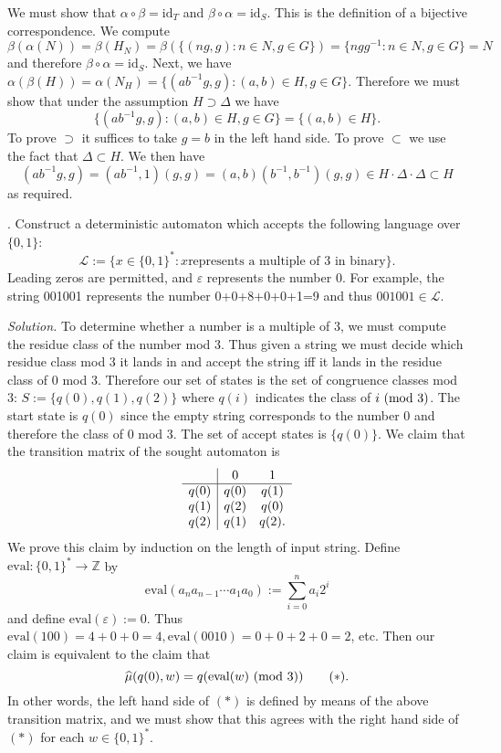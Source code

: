 \documentclass[10pt,a4paper,reqno]{amsart}
\begin{document}
We must show that $\alpha \circ \beta = \mathrm{id}_T$ and $\beta \circ \alpha
= \mathrm{id}_S$. This is the definition of a bijective correspondence. We
compute \[\beta(\alpha(N)) = \beta(H_N) = \beta( \{(ng,g) : n\in N, g\in G\}  )
= \{n g g^{-1} : n \in N, g \in G\} = N\] and therefore $\beta\circ \alpha =
\mathrm{id}_S$. Next, we have \( \alpha(\beta(H)) = \alpha(N_H) = \{
(ab^{-1}g,g) : (a,b) \in H, g\in G \}.\) Therefore we must show that under
the assumption $H \supset \Delta$ we have \[\{ (ab^{-1}g,g) : (a,b) \in H,
g\in G \} = \{(a,b) \in H\}.\] To prove $\supset$ it suffices to take $g=b$
in the left hand side. To prove $\subset$ we use the fact that $\Delta
\subset H$. We then have $$(ab^{-1}g,g) = (ab^{-1},1)(g,g) =
(a,b)(b^{-1},b^{-1})(g,g) \in H\cdot \Delta \cdot \Delta \subset H$$ as
required.

\bigskip

. Construct a deterministic automaton which accepts the following
language over \(\{0,1\}\): \[\mathscr{L} := \{x \in \{0,1\}^* : x \text{
represents a multiple of 3 in binary}\}.\] Leading zeros are permitted, and
$\varepsilon$ represents the number 0. For example, the string 001001
represents the number 0+0+8+0+0+1=9 and thus $001001 \in \mathscr{L}$.

\bigskip

\emph{Solution.} To determine whether a number is a multiple of 3, we must
compute the residue class of the number mod 3. Thus given a string we must
decide which residue class mod 3 it lands in and accept the string iff it lands
in the residue class of 0 mod 3. Therefore our set of states is the set of
congruence classes mod 3: $S := \{q(0), q(1), q(2)\}$ where $q(i)$ indicates
the class of $i \text{ } (\mathrm{mod}\text{ } 3)$. The start state is $q(0)$ since the empty string
corresponds to the number 0 and therefore the class of 0 mod 3. The set of
accept states is \(\{q(0)\}\).  We claim that the transition matrix of the
sought automaton is
\[
\begin{array}{c|c c}
    & 0 & 1 \\
    \hline
    q(0) & q(0) & q(1)\\
    q(1) & q(2) & q(0) \\
    q(2) & q(1) & q(2).
\end{array}
\] We prove this claim by induction on the length of input string. Define
$\mathrm{eval} : \{0,1\}^* \rightarrow \mathbb{Z}$ by \[\mathrm{eval}(a_n
a_{n-1}\cdots a_1 a_0) := \sum_{i = 0}^n a_i 2^i\] and define
$\mathrm{eval}(\varepsilon) := 0$. Thus $\mathrm{eval}(100) = 4 + 0 + 0 = 4,
\mathrm{eval}(0010) = 0 + 0 + 2 + 0 = 2$, etc. Then our claim is equivalent to
the claim that \[\widehat{\mu}(q(0),w) = q(\mathrm{eval}(w)\text{ } (\mathrm{mod}\text{ } 3))
\tag{$*$}.\] In other words, the left hand side of $(*)$ is defined by means of
the above transition matrix, and we must show that this agrees with the right
hand side of $(*)$ for each $w\in \{0,1\}^*$.
\end{document}

